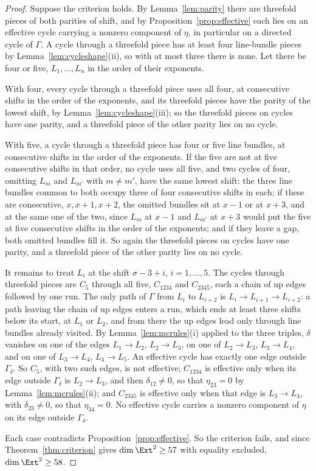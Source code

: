 \begin{proof}
Suppose the criterion holds. By Lemma~\ref{lem:parity} there are threefold pieces of both parities of shift, and by Proposition~\ref{prop:effective} each lies on an effective cycle carrying a nonzero component of $\eta$, in particular on a directed cycle of $\Gamma$. A cycle through a threefold piece has at least four line-bundle pieces by Lemma~\ref{lem:cycleshape}(ii), so with at most three there is none. Let there be four or five, $L_{1},\dots,L_{n}$ in the order of their exponents.

With four, every cycle through a threefold piece uses all four, at consecutive shifts in the order of the exponents, and its threefold pieces have the parity of the lowest shift, by Lemma~\ref{lem:cycleshape}(iii); so the threefold pieces on cycles have one parity, and a threefold piece of the other parity lies on no cycle.

With five, a cycle through a threefold piece has four or five line bundles, at consecutive shifts in the order of the exponents. If the five are not at five consecutive shifts in that order, no cycle uses all five, and two cycles of four, omitting $L_{m}$ and $L_{m'}$ with $m\ne m'$, have the same lowest shift: the three line bundles common to both occupy three of four consecutive shifts in each; if these are consecutive, $x,x+1,x+2$, the omitted bundles sit at $x-1$ or at $x+3$, and at the same one of the two, since $L_{m}$ at $x-1$ and $L_{m'}$ at $x+3$ would put the five at five consecutive shifts in the order of the exponents; and if they leave a gap, both omitted bundles fill it. So again the threefold pieces on cycles have one parity, and a threefold piece of the other parity lies on no cycle.

It remains to treat $L_{i}$ at the shift $\sigma-3+i$, $i=1,\dots,5$. The cycles through threefold pieces are $C_{5}$ through all five, $C_{1234}$ and $C_{2345}$, each a chain of up edges followed by one run. The only path of $\Gamma$ from $L_{i}$ to $L_{i+2}$ is $L_{i}\to L_{i+1}\to L_{i+2}$: a path leaving the chain of up edges enters a run, which ends at least three shifts below its start, at $L_{1}$ or $L_{2}$, and from there the up edges lead only through line bundles already visited. By Lemma~\ref{lem:mcrules}(i) applied to the three triples, $\delta$ vanishes on one of the edges $L_{1}\to L_{2}$, $L_{2}\to L_{3}$, on one of $L_{2}\to L_{3}$, $L_{3}\to L_{4}$, and on one of $L_{3}\to L_{4}$, $L_{4}\to L_{5}$. An effective cycle has exactly one edge outside $\Gamma_{\delta}$. So $C_{5}$, with two such edges, is not effective; $C_{1234}$ is effective only when its edge outside $\Gamma_{\delta}$ is $L_{2}\to L_{3}$, and then $\delta_{12}\ne0$, so that $\eta_{23}=0$ by Lemma~\ref{lem:mcrules}(ii); and $C_{2345}$ is effective only when that edge is $L_{3}\to L_{4}$, with $\delta_{23}\ne0$, so that $\eta_{34}=0$. No effective cycle carries a nonzero component of $\eta$ on its edge outside $\Gamma_{\delta}$.

Each case contradicts Proposition~\ref{prop:effective}. So the criterion fails, and since Theorem~\ref{thm:criterion} gives $\dim\Ext^{2}\ge57$ with equality excluded, $\dim\Ext^{2}\ge58$.
\end{proof}


